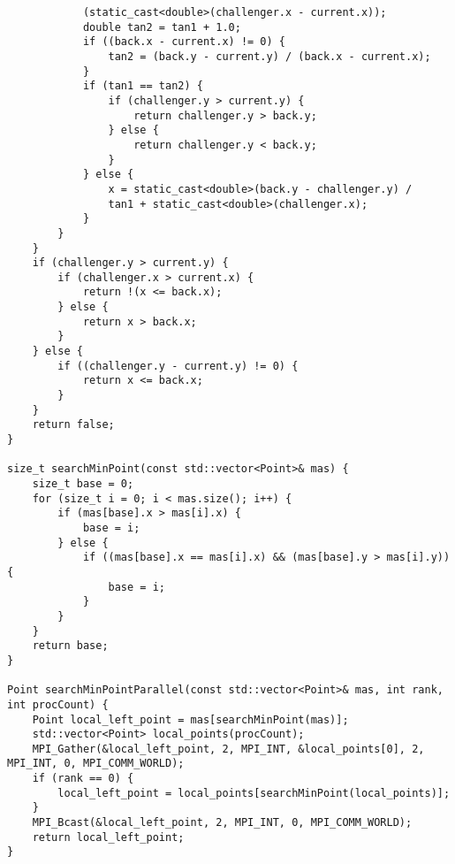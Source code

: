 \documentclass{report}
\begin{document}
\begin{lstlisting}
            (static_cast<double>(challenger.x - current.x));
            double tan2 = tan1 + 1.0;
            if ((back.x - current.x) != 0) {
                tan2 = (back.y - current.y) / (back.x - current.x);
            }
            if (tan1 == tan2) {
                if (challenger.y > current.y) {
                    return challenger.y > back.y;
                } else {
                    return challenger.y < back.y;
                }
            } else {
                x = static_cast<double>(back.y - challenger.y) /
                tan1 + static_cast<double>(challenger.x);
            }
        }
    }
    if (challenger.y > current.y) {
        if (challenger.x > current.x) {
            return !(x <= back.x);
        } else {
            return x > back.x;
        }
    } else {
        if ((challenger.y - current.y) != 0) {
            return x <= back.x;
        }
    }
    return false;
}

size_t searchMinPoint(const std::vector<Point>& mas) {
    size_t base = 0;
    for (size_t i = 0; i < mas.size(); i++) {
        if (mas[base].x > mas[i].x) {
            base = i;
        } else {
            if ((mas[base].x == mas[i].x) && (mas[base].y > mas[i].y)) {
                base = i;
            }
        }
    }
    return base;
}

Point searchMinPointParallel(const std::vector<Point>& mas, int rank, int procCount) {
    Point local_left_point = mas[searchMinPoint(mas)];
    std::vector<Point> local_points(procCount);
    MPI_Gather(&local_left_point, 2, MPI_INT, &local_points[0], 2, MPI_INT, 0, MPI_COMM_WORLD);
    if (rank == 0) {
        local_left_point = local_points[searchMinPoint(local_points)];
    }
    MPI_Bcast(&local_left_point, 2, MPI_INT, 0, MPI_COMM_WORLD);
    return local_left_point;
}


\end{lstlisting}
\end{document}
